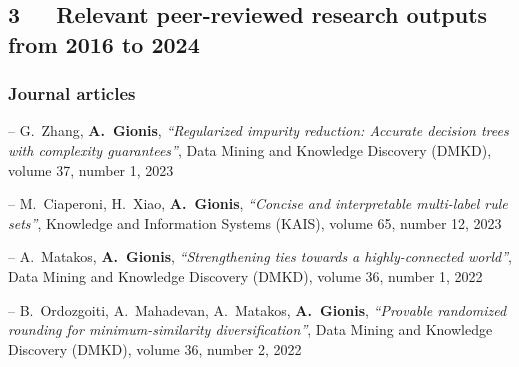 \documentclass[a4paper,11pt]{article}
\begin{document}
\biblistnend



\subsection*{3~~~Relevant peer-reviewed research outputs from 2016 to 2024}

\subsubsection*{Journal articles}

\biblist

\item[--] 
{G.\ Zhang, \textbf{A.\ Gionis}},
{\em ``Regularized impurity reduction: Accurate decision trees with complexity guarantees''},
Data Mining and Knowledge Discovery (DMKD), 
volume 37, number 1, 2023

\item[--] 
{ M.\ Ciaperoni, H.\ Xiao, \textbf{A.\ Gionis}},
{\em ``Concise and interpretable multi-label rule sets''}, 
Knowledge and Information Systems (KAIS),
volume 65, number 12, 2023

\item[--] 
{A.\ Matakos, \textbf{A.\ Gionis}},
{\em ``Strengthening ties towards a highly-connected world''},
Data Mining and Knowledge Discovery (DMKD),
volume 36, number 1, 2022

\item[--] 
{B.\ Ordozgoiti, A.\ Mahadevan, A.\ Matakos, \textbf{A.\ Gionis}},
{\em ``Provable randomized rounding for minimum-similarity diversification''},
Data Mining and Knowledge Discovery (DMKD),
volume 36, number 2, 2022
\end{document}
